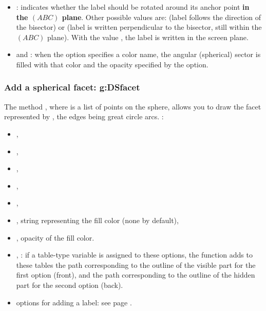 \begin{itemize}
\begin{itemize}
        \item {} : indicates whether the label should be rotated around its anchor point \textbf{in the $(ABC)$ plane}. Other possible values ​​are:  (label follows the direction of the bisector) or  (label is written perpendicular to the bisector, still within the $(ABC)$ plane). With the value , the label is written in the screen plane.
        
        \item {} and : when the  option specifies a color name, the angular (spherical) sector is filled with that color and the opacity specified by the  option.
    \end{itemize}
\end{itemize}

\subsubsection{Add a spherical facet: g:DSfacet}

The method , where  is a list of points on the sphere, allows you to draw the facet represented by , the edges being great circle arcs. \writeoptions:
\begin{itemize}
    \item {},
    \item {},
    \item {},
    \item {},
    \item {},
    \item {}, string representing the fill color (none by default),
    \item {}, opacity of the fill color.
    \item {}, : if a table-type variable is assigned to these options, the function adds to these tables the path corresponding to the outline of the visible part for the first option (front), and the path corresponding to the outline of the hidden part for the second option (back).    
    \item options for adding a label: see page \pageref{addlabel}.
\end{itemize}

